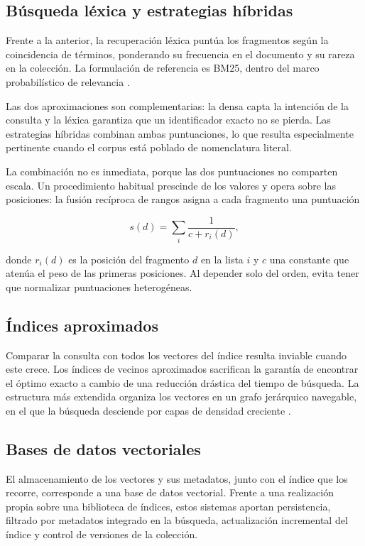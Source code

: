 \subsection{Búsqueda léxica y estrategias híbridas}

Frente a la anterior, la recuperación léxica puntúa los fragmentos según la
coincidencia de términos, ponderando su frecuencia en el documento y su rareza
en la colección. La formulación de referencia es BM25, dentro del marco
probabilístico de relevancia \cite{robertson2009bm25}.

Las dos aproximaciones son complementarias: la densa capta la intención de la
consulta y la léxica garantiza que un identificador exacto no se pierda. Las
estrategias híbridas combinan ambas puntuaciones, lo que resulta especialmente
pertinente cuando el corpus está poblado de nomenclatura literal.

La combinación no es inmediata, porque las dos puntuaciones no comparten escala.
Un procedimiento habitual prescinde de los valores y opera sobre las posiciones:
la fusión recíproca de rangos asigna a cada fragmento una puntuación

\begin{equation}
  s(d) = \sum_{i} \frac{1}{c + r_i(d)} ,
  \label{eq:rrf}
\end{equation}

donde $r_i(d)$ es la posición del fragmento $d$ en la lista $i$ y $c$ una
constante que atenúa el peso de las primeras posiciones. Al depender solo del
orden, evita tener que normalizar puntuaciones heterogéneas.

\subsection{Índices aproximados}

Comparar la consulta con todos los vectores del índice resulta inviable cuando
este crece. Los índices de vecinos aproximados sacrifican la garantía de
encontrar el óptimo exacto a cambio de una reducción drástica del tiempo de
búsqueda. La estructura más extendida organiza los vectores en un grafo
jerárquico navegable, en el que la búsqueda desciende por capas de densidad
creciente \cite{malkov2020hnsw}.

\subsection{Bases de datos vectoriales}

El almacenamiento de los vectores y sus metadatos, junto con el índice que los
recorre, corresponde a una base de datos vectorial. Frente a una realización
propia sobre una biblioteca de índices, estos sistemas aportan persistencia,
filtrado por metadatos integrado en la búsqueda, actualización incremental del
índice y control de versiones de la colección.

